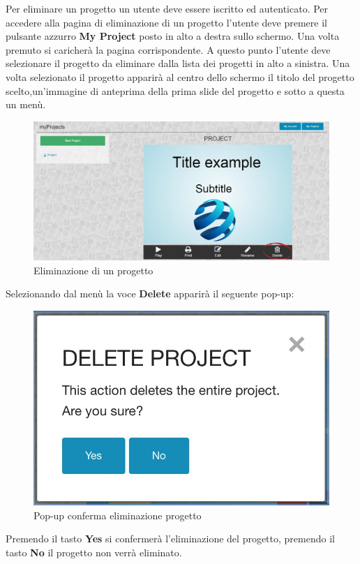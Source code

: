 Per eliminare un progetto un utente deve essere iscritto ed autenticato. Per accedere alla pagina di eliminazione di un progetto l'utente deve premere il pulsante azzurro \textbf{My Project} posto in alto a destra sullo schermo. Una volta premuto si caricherà la pagina corrispondente. A questo punto l'utente deve selezionare il progetto da eliminare dalla lista dei progetti in alto a sinistra.
Una volta selezionato il progetto apparirà al centro dello schermo il titolo del progetto scelto,un'immagine di anteprima della prima slide del progetto e sotto a questa un menù. 

\begin{figure}[H] 
	\centering 
	\includegraphics[scale=0.40] {img/elimina_pro}
	\caption{Eliminazione di un progetto} 
\end{figure}

Selezionando dal menù la voce \textbf{Delete} apparirà il seguente pop-up:

\begin{figure}[H] 
	\centering 
	\includegraphics[scale=0.60] {img/del_project}
	\caption{Pop-up conferma eliminazione progetto} 
\end{figure}

\noindent Premendo il tasto \textbf{Yes} si confermerà l'eliminazione del progetto, premendo il tasto \textbf{No} il progetto non verrà eliminato.